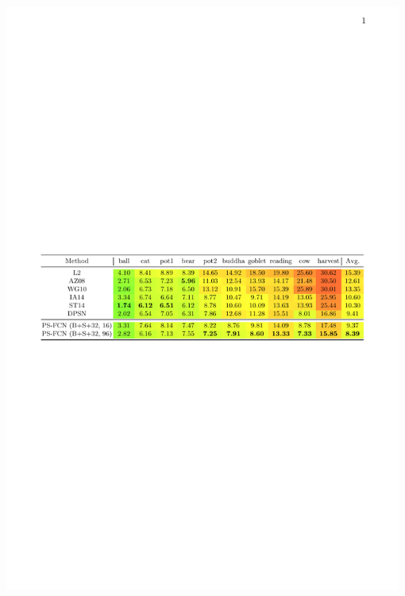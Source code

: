 \documentclass[a0paper,landscape]{baposter}
\begin{document}
\begin{poster}
{\begin{minipage}[t]{0.5\textwidth}
\begin{center}
                \includegraphics[width=0.98\textwidth]{images/res_quant_diligent_main}
            \end{center}
        \end{minipage}

        \vspace{0.5em}

}
\end{poster}
\end{document}

